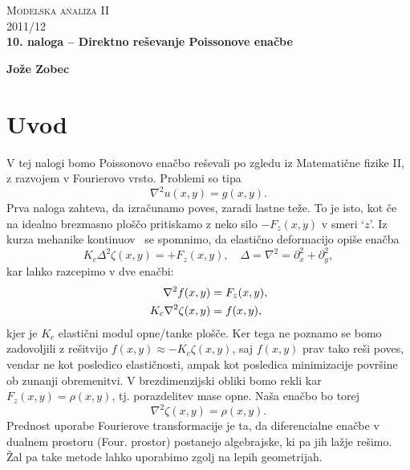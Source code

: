 \documentclass[a4 paper, 12pt]{article}
\begin{document}
\begin{center}
\textsc{Modelska analiza II}\\
\textsc{2011/12}\\[0.5cm]
\textbf{10. naloga -- Direktno re\v sevanje Poissonove ena\v cbe}
\end{center}
\begin{flushright}
\textbf{Jože Zobec}\\
\end{flushright}

\section{Uvod}

V tej nalogi bomo Poissonovo ena\v cbo re\v sevali po zgledu iz Matemati\v cne fizike II, z razvojem v
Fourierovo vrsto. Problemi so tipa
\[
	\nabla^2 u (x,y) = g (x,y).
\]
Prva naloga zahteva, da izra\v cunamo poves, zaradi lastne te\v ze. To je isto, kot \v ce na idealno
brezmasno plo\v s\v co pritiskamo z neko silo $-F_z(x,y)$ v smeri `$z$'. Iz kurza mehanike
kontinuov~\cite[str.~84]{podgornik} se spomnimo, da elasti\v cno deformacijo opi\v se ena\v cba
\[
	K_c\Delta^2 \zeta (x,y) = +F_z(x,y), \quad \Delta = \nabla^2 = \partial_x^2 + \partial_y^2,
\]
kar lahko razcepimo v dve ena\v cbi:
\begin{align}
	\nabla^2 f (x, y) &= F_z (x,y), \notag \\
	K_c\nabla^2 \zeta (x,y) &= f (x,y),
\end{align}
kjer je $K_c$ elasti\v cni modul opne/tanke plo\v s\v ce. Ker tega ne poznamo se bomo zadovoljili z
re\v sitvijo $f(x,y) \approx -K_c \zeta(x,y)$, saj $f(x,y)$ prav tako re\v si poves, vendar ne kot
posledico elasti\v cnosti, ampak kot posledica minimizacije povr\v sine ob zunanji obremenitvi.
V brezdimenzijski obliki bomo rekli kar $F_z(x,y) = \rho(x,y)$, tj. porazdelitev mase opne. Na\v sa
ena\v cbo bo torej
\[
    \nabla^2 \zeta (x,y) = \rho (x,y).
\]
Prednost uporabe Fourierove transformacije je ta, da diferencialne ena\v cbe v dualnem prostoru (Four.
prostor) postanejo algebrajske, ki pa jih la\v zje re\v simo. \v Zal pa take metode lahko uporabimo zgolj
na lepih geometrijah.
\end{document}
